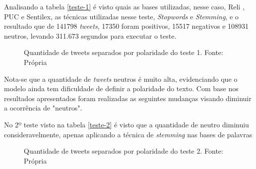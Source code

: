 Analisando a tabela \ref{teste-1} é visto quais as bases utilizadas, nesse caso, Reli , PUC e Sentilex, as técnicas utilizadas nesse teste, \textit{Stopwords} e \textit{Stemming}, e o resultado que de 141798 \textit{tweets}, 17350 foram positivos, 15517 negativos e 108931 neutros, levando 311.673 segundos para executar o teste.
\begin{figure}[!h]
	\centering{}
	\caption{Quantidade de tweets separados por polaridade do teste 1. Fonte: Própria}
	\label{teste-graf-1}
\end{figure}

Nota-se que a quantidade de \textit{tweets} neutros é muito alta, evidenciando que o modelo ainda tem dificuldade de definir a polaridade do texto. Com base nos resultados apresentados foram realizadas as seguintes mudanças visando diminuir a ocorrência de "neutros".
 

\begin{table}[]
	\caption{2º teste}
	\label{teste-2}
\end{table}

No 2º teste visto na tabela \ref{teste-2} é visto que a quantidade de neutro diminuiu consideravelmente, apenas aplicando a técnica de \textit{stemming} nas bases de palavras
\begin{figure}[!h]
	\centering{}
	\caption{Quantidade de tweets separados por polaridade do teste 2. Fonte: Própria}
	\label{teste-graf-2}
\end{figure}

